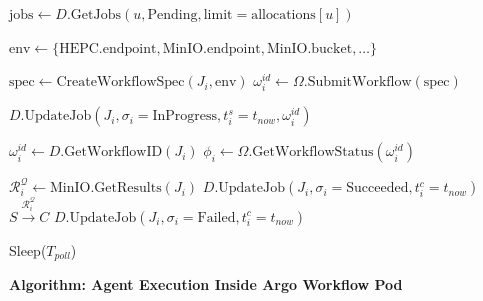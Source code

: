 \documentclass[11pt]{article}
\begin{document}
\begin{algorithmic}[1]
          \State {}
            \State $\text{jobs} \gets D.\text{GetJobs}(u, \text{Pending}, \text{limit}=\text{allocations}[u])$

              \State $\text{env} \gets \{\text{HEPC.endpoint}, \text{MinIO.endpoint}, \text{MinIO.bucket}, \ldots\}$

              \State $\text{spec} \gets \text{CreateWorkflowSpec}(J_i, \text{env})$
              \State $\omega_i^{id} \gets \Omega.\text{SubmitWorkflow}(\text{spec})$

              \State $D.\text{UpdateJob}(J_i, \sigma_i=\text{InProgress}, t_i^s=t_{now}, \omega_i^{id})$
            \EndFor
          \EndFor
        \EndIf

        \State {}
          \State $\omega_i^{id} \gets D.\text{GetWorkflowID}(J_i)$
          \State $\phi_i \gets \Omega.\text{GetWorkflowStatus}(\omega_i^{id})$

            \State $\mathcal{R}_i^{\mathcal{Q}} \gets \text{MinIO}.\text{GetResults}(J_i)$
            \State $D.\text{UpdateJob}(J_i, \sigma_i=\text{Succeeded}, t_i^c=t_{now})$
            \State $S \xrightarrow{\mathcal{R}_i^{\mathcal{Q}}} C$
            \State $D.\text{UpdateJob}(J_i, \sigma_i=\text{Failed}, t_i^c=t_{now})$
          \EndIf
        \EndFor

        \State Sleep($T_{poll}$)
      \EndWhile

    \EndProcedure
\end{algorithmic}

\vspace{1em}

\noindent\textbf{Algorithm: Agent Execution Inside Argo Workflow Pod}
\end{document}
